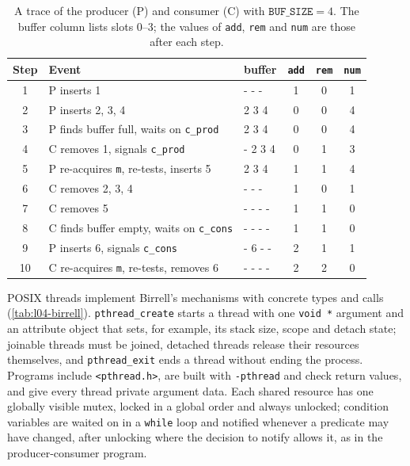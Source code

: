 \documentclass[../main.tex]{subfiles}
\begin{document}
\begin{table}[htbp]
  \centering
  \caption{A trace of the producer (P) and consumer (C) with
    $\texttt{BUF\_SIZE}=4$.  The buffer column lists slots 0--3; the values
    of \texttt{add}, \texttt{rem} and \texttt{num} are those after each
    step.}
  \label{tab:l04-prodcons-trace}
  \small
  \begin{tabular}{@{}cl>{\ttfamily}lccc@{}}
    \toprule
    Step & Event & \normalfont buffer & \texttt{add} & \texttt{rem} & \texttt{num} \\
    \midrule
     1 & P inserts 1                         & 1 - - -  & 1 & 0 & 1 \\
     2 & P inserts 2, 3, 4                   & 1 2 3 4  & 0 & 0 & 4 \\
     3 & P finds buffer full, waits on \texttt{c\_prod} & 1 2 3 4 & 0 & 0 & 4 \\
     4 & C removes 1, signals \texttt{c\_prod} & - 2 3 4 & 0 & 1 & 3 \\
     5 & P re-acquires \texttt{m}, re-tests, inserts 5 & 5 2 3 4 & 1 & 1 & 4 \\
     6 & C removes 2, 3, 4                   & 5 - - -  & 1 & 0 & 1 \\
     7 & C removes 5                         & - - - -  & 1 & 1 & 0 \\
     8 & C finds buffer empty, waits on \texttt{c\_cons} & - - - - & 1 & 1 & 0 \\
     9 & P inserts 6, signals \texttt{c\_cons} & - 6 - - & 2 & 1 & 1 \\
    10 & C re-acquires \texttt{m}, re-tests, removes 6 & - - - - & 2 & 2 & 0 \\
    \bottomrule
  \end{tabular}
\end{table}

\begin{keypoint}
  POSIX threads implement Birrell's mechanisms with concrete types and
  calls (\cref{tab:l04-birrell}).  \texttt{pthread\_create} starts a thread
  with one \texttt{void~*} argument and an attribute object that sets, for
  example, its stack size, scope and detach state; joinable threads must be
  joined, detached threads release their resources themselves, and
  \texttt{pthread\_exit} ends a thread without ending the process.
  Programs include \texttt{<pthread.h>}, are built with \texttt{-pthread}
  and check return values, and give every thread private argument data.
  Each shared resource has one globally visible mutex, locked in a global
  order and always unlocked; condition variables are waited on in a
  \texttt{while} loop and notified whenever a predicate may have changed,
  after unlocking where the decision to notify allows it, as in the
  producer-consumer program.
\end{keypoint}
\end{document}
